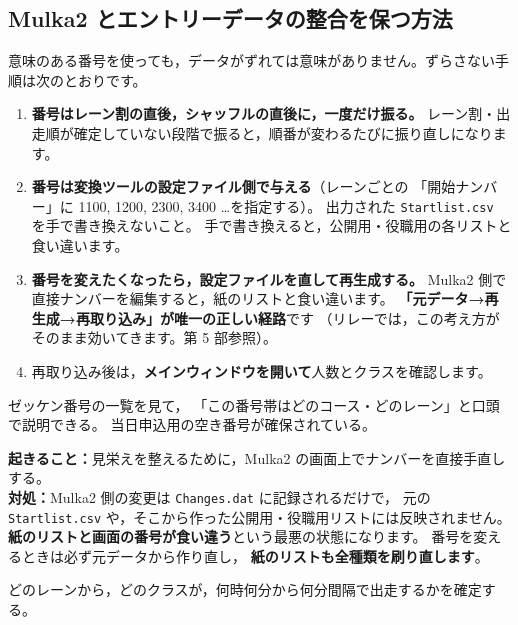 \subsection*{Mulka2 とエントリーデータの整合を保つ方法}

意味のある番号を使っても，データがずれては意味がありません。ずらさない手順は次のとおりです。

\begin{enumerate}
\item \textbf{番号はレーン割の直後，シャッフルの直後に，一度だけ振る。}
      レーン割・出走順が確定していない段階で振ると，順番が変わるたびに振り直しになります。
\item \textbf{番号は変換ツールの設定ファイル側で与える}（レーンごとの
      「開始ナンバー」に 1100, 1200, 2300, 3400 …を指定する）。
      出力された \texttt{Startlist.csv} を手で書き換えないこと。
      手で書き換えると，公開用・役職用の各リストと食い違います。
\item \textbf{番号を変えたくなったら，設定ファイルを直して再生成する。}
      Mulka2 側で直接ナンバーを編集すると，紙のリストと食い違います。
      \textbf{「元データ→再生成→再取り込み」が唯一の正しい経路}です
      （リレーでは，この考え方がそのまま効いてきます。第 5 部参照）。
\item 再取り込み後は，\textbf{メインウィンドウを開いて}人数とクラスを確認します。
\end{enumerate}

\begin{Done}
ゼッケン番号の一覧を見て，
「この番号帯はどのコース・どのレーン」と口頭で説明できる。
当日申込用の空き番号が確保されている。
\end{Done}

\begin{Fail}
\textbf{起きること：}見栄えを整えるために，Mulka2 の画面上でナンバーを直接手直しする。\\
\textbf{対処：}Mulka2 側の変更は \texttt{Changes.dat} に記録されるだけで，
元の \texttt{Startlist.csv} や，そこから作った公開用・役職用リストには反映されません。
\textbf{紙のリストと画面の番号が食い違う}という最悪の状態になります。
番号を変えるときは必ず元データから作り直し，
\textbf{紙のリストも全種類を刷り直します}。
\end{Fail}


\begin{Goal}
どのレーンから，どのクラスが，何時何分から何分間隔で出走するかを確定する。
\end{Goal}

